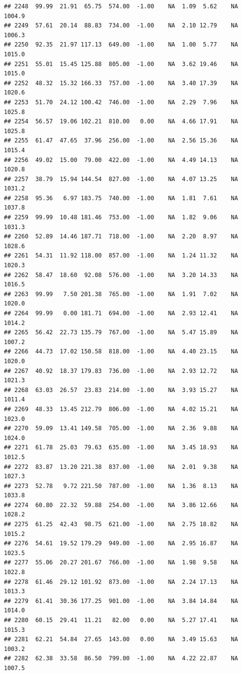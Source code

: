 \documentclass{article}\usepackage{graphicx, color}
\makeatletter
\newenvironment{kframe}{%
 \def\at@end@of@kframe{}%
 \ifinner\ifhmode%
  \def\at@end@of@kframe{\end{minipage}}%
  \begin{minipage}{\columnwidth}%
 \fi\fi%
 \def\FrameCommand##1{\hskip\@totalleftmargin \hskip-\fboxsep
 \colorbox{shadecolor}{##1}\hskip-\fboxsep
     \hskip-\linewidth \hskip-\@totalleftmargin \hskip\columnwidth}%
 \MakeFramed {\advance\hsize-\width
   \@totalleftmargin\z@ \linewidth\hsize
   \@setminipage}}%
 {\par\unskip\endMakeFramed%
 \at@end@of@kframe}
\newenvironment{knitrout}{}{} %
\makeatother
\begin{document}
\begin{knitrout}
\begin{kframe}
\begin{verbatim}
## 2248  99.99  21.91  65.75  574.00  -1.00    NA  1.09  5.62    NA 1004.9
## 2249  57.61  20.14  88.83  734.00  -1.00    NA  2.10 12.79    NA 1006.3
## 2250  92.35  21.97 117.13  649.00  -1.00    NA  1.00  5.77    NA 1015.0
## 2251  55.01  15.45 125.88  805.00  -1.00    NA  3.62 19.46    NA 1015.0
## 2252  48.32  15.32 166.33  757.00  -1.00    NA  3.40 17.39    NA 1020.6
## 2253  51.70  24.12 100.42  746.00  -1.00    NA  2.29  7.96    NA 1025.8
## 2254  56.57  19.06 102.21  810.00   0.00    NA  4.66 17.91    NA 1025.8
## 2255  61.47  47.65  37.96  256.00  -1.00    NA  2.56 15.36    NA 1015.4
## 2256  49.02  15.00  79.00  422.00  -1.00    NA  4.49 14.13    NA 1020.8
## 2257  38.79  15.94 144.54  827.00  -1.00    NA  4.07 13.25    NA 1031.2
## 2258  95.36   6.97 183.75  740.00  -1.00    NA  1.81  7.61    NA 1037.8
## 2259  99.99  10.48 181.46  753.00  -1.00    NA  1.82  9.06    NA 1031.3
## 2260  52.89  14.46 187.71  718.00  -1.00    NA  2.20  8.97    NA 1028.6
## 2261  54.31  11.92 118.00  857.00  -1.00    NA  1.24 11.32    NA 1020.3
## 2262  58.47  18.60  92.08  576.00  -1.00    NA  3.20 14.33    NA 1016.5
## 2263  99.99   7.50 201.38  765.00  -1.00    NA  1.91  7.02    NA 1020.0
## 2264  99.99   0.00 181.71  694.00  -1.00    NA  2.93 12.41    NA 1014.2
## 2265  56.42  22.73 135.79  767.00  -1.00    NA  5.47 15.89    NA 1007.2
## 2266  44.73  17.02 150.58  818.00  -1.00    NA  4.40 23.15    NA 1020.0
## 2267  40.92  18.37 179.83  736.00  -1.00    NA  2.93 12.72    NA 1021.3
## 2268  63.03  26.57  23.83  214.00  -1.00    NA  3.93 15.27    NA 1011.4
## 2269  48.33  13.45 212.79  806.00  -1.00    NA  4.02 15.21    NA 1023.0
## 2270  59.09  13.41 149.58  705.00  -1.00    NA  2.36  9.88    NA 1024.0
## 2271  61.78  25.03  79.63  635.00  -1.00    NA  3.45 18.93    NA 1012.5
## 2272  83.87  13.20 221.38  837.00  -1.00    NA  2.01  9.38    NA 1027.3
## 2273  52.78   9.72 221.50  787.00  -1.00    NA  1.36  8.13    NA 1033.8
## 2274  60.80  22.32  59.88  254.00  -1.00    NA  3.86 12.66    NA 1028.2
## 2275  61.25  42.43  98.75  621.00  -1.00    NA  2.75 18.82    NA 1015.2
## 2276  54.61  19.52 179.29  949.00  -1.00    NA  2.95 16.87    NA 1023.5
## 2277  55.06  20.27 201.67  766.00  -1.00    NA  1.98  9.58    NA 1022.8
## 2278  61.46  29.12 101.92  873.00  -1.00    NA  2.24 17.13    NA 1013.3
## 2279  61.41  30.36 177.25  901.00  -1.00    NA  3.84 14.84    NA 1014.0
## 2280  60.15  29.41  11.21   82.00   0.00    NA  5.27 17.41    NA 1015.3
## 2281  62.21  54.84  27.65  143.00   0.00    NA  3.49 15.63    NA 1003.2
## 2282  62.38  33.58  86.50  799.00  -1.00    NA  4.22 22.87    NA 1007.5

\end{verbatim}
\end{kframe}
\end{knitrout}
\end{document}
